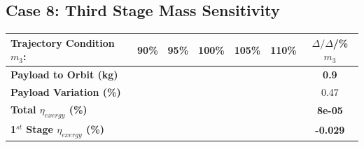 \subsection{Case 8: Third Stage Mass Sensitivity}\label{sec:m3noReturn}

\begin{table}[ht]
	\centering
	
	\begin{tabular}{l c c c c c c} 
		\hline \textbf{Trajectory Condition}   \qquad  $m_{3}$:
		&90\%
		&95\%
		&100\%
		&105\%
		&110\%
		& $\Delta/\Delta$/\%$m_{3}$
		\\
		\hline \textbf{Payload to Orbit (kg)}
		& \textbf{\PayloadToOrbitmThreeNinetyNoReturn}
		& \textbf{\PayloadToOrbitmThreeNinetyFiveNoReturn}
		& \textbf{\PayloadToOrbitmThreeStandardNoReturn}
		& \textbf{\PayloadToOrbitmThreeOneHundredFiveNoReturn}
		& \textbf{\PayloadToOrbitmThreeOneHundredTenNoReturn}
		&\textbf{0.9}
		\\
		\textbf{Payload Variation (\%)}
		& \PayloadVarmThreeNinetyNoReturn
		& \PayloadVarmThreeNinetyFiveNoReturn
		& \PayloadVarmThreeStandardNoReturn
		& \PayloadVarmThreeOneHundredFiveNoReturn
		& \PayloadVarmThreeOneHundredTenNoReturn
		&0.47
		\\
		\textbf{Total $\eta_{exergy}$ (\%)}
		& \textbf{\totalExergyEffmThreeNinetyNoReturn}
		& \textbf{\totalExergyEffmThreeNinetyFiveNoReturn}
		& \textbf{\totalExergyEffmThreeStandardNoReturn}
		& \textbf{\totalExergyEffmThreeOneHundredFiveNoReturn}
		& \textbf{\totalExergyEffmThreeOneHundredTenNoReturn}
		& \textbf{8e-05}
		\\
		\hline 
		\textbf{1$^{st}$ Stage $\eta_{exergy}$ (\%)}
		& \textbf{\firstExergyEffmThreeNinetyNoReturn}
		& \textbf{\firstExergyEffmThreeNinetyFiveNoReturn}
		& \textbf{\firstExergyEffmThreeStandardNoReturn}
		& \textbf{\firstExergyEffmThreeOneHundredFiveNoReturn}
		& \textbf{\firstExergyEffmThreeOneHundredTenNoReturn}
		& \textbf{-0.029}
		\\
	

\end{tabular}
\end{table}
